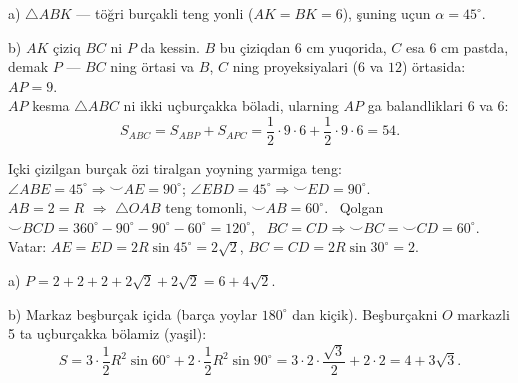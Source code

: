 a) $\triangle ABK$ — töğri burçakli teng yonli ($AK=BK=6$), şuning uçun $\alpha=45^\circ$.

b) $AK$ çiziq $BC$ ni $P$ da kessin. $B$ bu çiziqdan 6 cm yuqorida, $C$ esa 6 cm pastda, demak $P$ — $BC$ ning örtasi va $B$, $C$ ning proyeksiyalari ($6$ va $12$) örtasida: $AP=9$.\\
$AP$ kesma $\triangle ABC$ ni ikki uçburçakka böladi, ularning $AP$ ga balandliklari $6$ va $6$:
\[S_{ABC}=S_{ABP}+S_{APC}=\frac12\cdot9\cdot6+\frac12\cdot9\cdot6=54.\]

\newpage
{}
Içki çizilgan burçak özi tiralgan yoyning yarmiga teng:\\
$\angle ABE=45^\circ\Rightarrow \smile AE=90^\circ$; \quad $\angle EBD=45^\circ\Rightarrow \smile ED=90^\circ$.\\
$AB=2=R$ $\Rightarrow$ $\triangle OAB$ teng tomonli, $\smile AB=60^\circ$. \ Qolgan $\smile BCD=360^\circ-90^\circ-90^\circ-60^\circ=120^\circ$, \ $BC=CD\Rightarrow \smile BC=\smile CD=60^\circ$.\\
Vatar: $AE=ED=2R\sin45^\circ=2\sqrt2$, \quad $BC=CD=2R\sin30^\circ=2$.

a) $P=2+2+2+2\sqrt2+2\sqrt2=6+4\sqrt2$.

b) Markaz beşburçak içida (barça yoylar $180^\circ$ dan kiçik). Beşburçakni $O$ markazli 5 ta uçburçakka bölamiz (\textcolor{okgreen}{yaşil}):
\[S=3\cdot\frac12R^2\sin60^\circ+2\cdot\frac12R^2\sin90^\circ=3\cdot2\cdot\frac{\sqrt3}2+2\cdot2=4+3\sqrt3.\]


